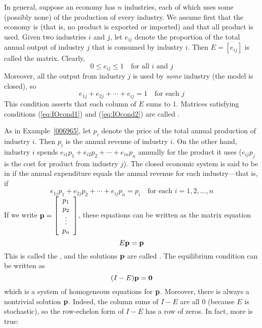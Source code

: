 \documentclass{ximera}
\begin{document}
In general, suppose an economy has $n$ industries, each of which uses some (possibly none) of the production of every industry. We assume first that the economy is  (that is, no product is exported or imported) and that all product is used. Given two industries $i$ and $j$, let $e_{ij}$ denote the proportion of the total annual output of industry $j$ that is consumed by industry $i$. Then $E = \left[ e_{ij} \right]$ is called the  matrix.  Clearly,
\begin{equation}\label{eq:IOcond1}
0 \leq e_{ij} \leq 1 \quad \mbox{for all } i \mbox{ and } j
\end{equation}
Moreover, all the output from industry $j$ is used by \textit{some} industry (the model is closed), so
\begin{equation}\label{eq:IOcond2}
e_{1j} + e_{2j} + \cdots + e_{ij} = 1 \quad \mbox{for each } j
\end{equation}
This condition asserts that each column of $E$ sums to $1$. Matrices satisfying conditions (\ref{eq:IOcond1}) and (\ref{eq:IOcond2}) are called .

As in Example~\ref{006965}, let $p_{i}$ denote the price of the total annual production of industry $i$. Then $p_{i}$ is the annual revenue of industry $i$. On the other hand, industry $i$ spends $e_{i1}p_{1} + e_{i2}p_{2} + \cdots + e_{in}p_{n}$ annually for the product it uses ($e_{ij}p_{j}$ is the cost for product from industry $j$). The closed economic system is said to be in  if the annual expenditure equals the annual revenue for each industry---that is, if
\begin{equation*}
e_{1j}p_{1} + e_{2j}p_{2} + \cdots + e_{ij}p_{n} = p_{i} \quad \mbox{for each } i = 1, 2, \dots, n
\end{equation*}
If we write ${\bf p} = \left[ \begin{array}{c}
p_{1} \\
p_{2} \\
\vdots \\
p_{n}
\end{array} \right]$,
 these equations can be written as the matrix equation
\begin{equation*}
E{\bf p} = {\bf p}
\end{equation*}
This is called the , and the solutions ${\bf p}$ are called . The equilibrium condition can be written as
\begin{equation*}
(I - E){\bf p} = {\bf 0}
\end{equation*}
which is a system of homogeneous equations for ${\bf p}$. Moreover, there is always a nontrivial solution ${\bf p}$. Indeed, the column sums of $I - E$ are all $0$ (because $E$ is stochastic), so the row-echelon form of $I - E$ has a row of zeros. In fact, more is true:
\end{document}
